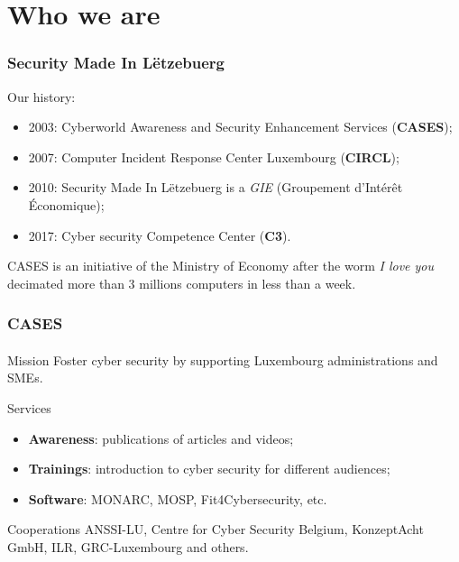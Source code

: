 %
%
\section*{Who we are}
\begin{frame}
  \frametitle{Security Made In Lëtzebuerg}
  Our history:
  \begin{center}
    \begin{itemize}
      \item 2003: Cyberworld Awareness and Security Enhancement Services (\textbf{CASES});
      \item 2007: Computer Incident Response Center Luxembourg (\textbf{CIRCL});
      \item 2010: Security Made In Lëtzebuerg is a \textit{GIE} (Groupement d’Intérêt Économique);
      \item 2017: Cyber security Competence Center (\textbf{C3}).
    \end{itemize}
  \end{center}
  CASES is an initiative of the Ministry of Economy after the worm
  \textit{I love you} decimated more than 3 millions computers in less than a week.
\end{frame}

\begin{frame}
  \frametitle{CASES}
  \framesubtitle{}
  \begin{block}{Mission}
    Foster cyber security by supporting Luxembourg administrations and SMEs.
  \end{block}

  \begin{block}{Services}
    \begin{center}
      \begin{itemize}
        \item \textbf{Awareness}: publications of articles and videos;
        \item \textbf{Trainings}:
        introduction to cyber security for different audiences;
        \item \textbf{Software}:
        MONARC, MOSP, Fit4Cybersecurity, etc.
      \end{itemize}
    \end{center}
  \end{block}

  \begin{block}{Cooperations}
    ANSSI-LU,
    Centre for Cyber Security Belgium, KonzeptAcht GmbH, ILR, GRC-Luxembourg and others.
  \end{block}
\end{frame}

